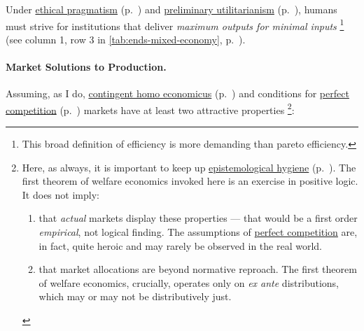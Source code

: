 Under \hyperref[itm:pragmatic-ethics]{ethical pragmatism} (p.~\pageref{itm:pragmatic-ethics}) and \hyperref[sec:utilitarianism]{preliminary utilitarianism} (p.~\pageref{itm:utilitarianism}), humans must strive for institutions that deliver \emph{maximum outputs for minimal inputs}
\footnote{
	This broad definition of efficiency is more demanding than pareto efficiency.%
}
(see column 1, row 3 in \autoref{tab:ends-mixed-economy}, p.~\pageref{tab:ends-mixed-economy}). %

\paragraph{Market Solutions to Production.}  \label{sec:market-solutions-production}
Assuming, as I do, \hyperref[sec:contingent-homo-economicus]{contingent homo economicus} (p.~\pageref{sec:contingent-homo-economicus}) and conditions for \hyperref[sec:perfect-competition]{perfect competition} (p.~\pageref{sec:perfect-competition}) markets have at least two attractive properties
\footnote{
	Here, as always, it is important to keep up \hyperref[sec:epistemology]{epistemological hygiene} (p.~\pageref{sec:epistemology}). 
	The first theorem of welfare economics invoked here is an exercise in positive logic. 
	It does not imply:
	\begin{enumerate}
		\item 
			that \emph{actual} markets display these properties --- that would be a first order \emph{empirical}, not logical finding. 
			The assumptions of \hyperref[sec:perfect-competition]{perfect competition} are, in fact, quite heroic and may rarely be observed in the real world.	
		\item 
			that market allocations are beyond normative reproach. 
			The first theorem of welfare economics, crucially, operates only on \emph{ex ante} distributions, which may or may not be distributively just.
	\end{enumerate}
}:

